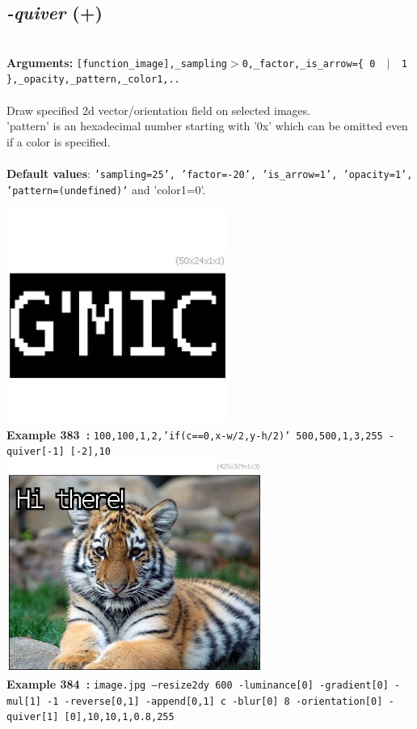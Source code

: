 \documentclass[a4paper,11pt,twoside]{book}
\begin{document}
\subsection{\emph{-quiver} (+)}\vspace*{-0.5em}
~\\\textbf{Arguments: } 
{\small \texttt{[function\_image],\_sampling$>$0,\_factor,\_is\_arrow=\{ 0 ~$|$~ 1 \},\_opacity,\_pattern,\_color1,..}}\\~\\
Draw specified 2d vector/orientation field on selected images.
~\\'pattern' is an hexadecimal number starting with '0x' which can be omitted
even if a color is specified.
~\\~\\\textbf{Default values}: {\small \texttt{'sampling=25', 'factor=-20', 'is\_arrow=1', 'opacity=1', 'pattern=(undefined)'}}
and 'color1=0'.
\begin{center}\includegraphics[keepaspectratio=true,height=7cm,width=\textwidth]{img/gmic_def383.jpg}\\
{\footnotesize \textbf{Example 383~:} \texttt{100,100,1,2,'if(c==0,x-w/2,y-h/2)' 500,500,1,3,255 -quiver[-1] [-2],10}}
\\\includegraphics[keepaspectratio=true,height=7cm,width=\textwidth]{img/gmic_def384.jpg}\\
{\footnotesize \textbf{Example 384~:} \texttt{image.jpg --resize2dy 600 -luminance[0] -gradient[0] -mul[1] -1 -reverse[0,1] -append[0,1] c -blur[0] 8 -orientation[0] -quiver[1] [0],10,10,1,0.8,255}}
\end{center}
\end{document}

